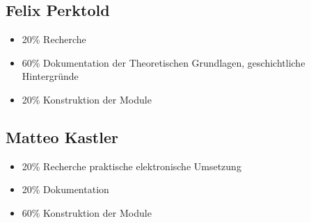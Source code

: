 \subsection{Felix Perktold}
\begin{itemize}
\item 20\% Recherche
\item 60\% Dokumentation der Theoretischen Grundlagen, geschichtliche Hintergründe
\item 20\% Konstruktion der Module
\end{itemize}

\subsection{Matteo Kastler}
\begin{itemize}
\item 20\% Recherche praktische elektronische Umsetzung
\item 20\% Dokumentation 
\item 60\% Konstruktion der Module
\end{itemize}
